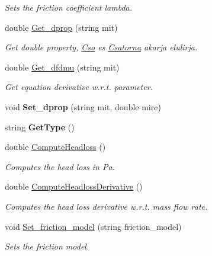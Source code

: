 \begin{DoxyCompactItemize}
\begin{DoxyCompactList}\small\item\em Sets the friction coefficient lambda. \end{DoxyCompactList}\item 
\hypertarget{class_cso_a674c356a597eb9d6c9a46726b35e2a00}{}\label{class_cso_a674c356a597eb9d6c9a46726b35e2a00} 
double \hyperlink{class_cso_a674c356a597eb9d6c9a46726b35e2a00}{Get\+\_\+dprop} (string mit)
\begin{DoxyCompactList}\small\item\em Get double property, \hyperlink{class_cso}{Cso} es \hyperlink{class_csatorna}{Csatorna} akarja elulirja. \end{DoxyCompactList}\item 
\hypertarget{class_cso_a794959559cb679efb0529417e1df6556}{}\label{class_cso_a794959559cb679efb0529417e1df6556} 
double \hyperlink{class_cso_a794959559cb679efb0529417e1df6556}{Get\+\_\+dfdmu} (string mit)
\begin{DoxyCompactList}\small\item\em Get equation derivative w.\+r.\+t. parameter. \end{DoxyCompactList}\item 
\hypertarget{class_cso_ae6db4734838a6261e89caeb53269e990}{}\label{class_cso_ae6db4734838a6261e89caeb53269e990} 
void {\bfseries Set\+\_\+dprop} (string mit, double mire)
\item 
\hypertarget{class_cso_a20b7469a9b992da3bc25c647cdfa23c8}{}\label{class_cso_a20b7469a9b992da3bc25c647cdfa23c8} 
string {\bfseries Get\+Type} ()
\item 
double \hyperlink{class_cso_a796d4ff0f69732001c91abe7e5ce7ed7}{Compute\+Headloss} ()
\begin{DoxyCompactList}\small\item\em Computes the head loss in Pa. \end{DoxyCompactList}\item 
double \hyperlink{class_cso_a5f8536643bc971ca70aebef850fa53a1}{Compute\+Headloss\+Derivative} ()
\begin{DoxyCompactList}\small\item\em Computes the head loss derivative w.\+r.\+t. mass flow rate. \end{DoxyCompactList}\item 
void \hyperlink{class_cso_a113196b16e49417924fea36b770f4d84}{Set\+\_\+friction\+\_\+model} (string friction\+\_\+model)
\begin{DoxyCompactList}\small\item\em Sets the friction model. \end{DoxyCompactList}\end{DoxyCompactItemize}
